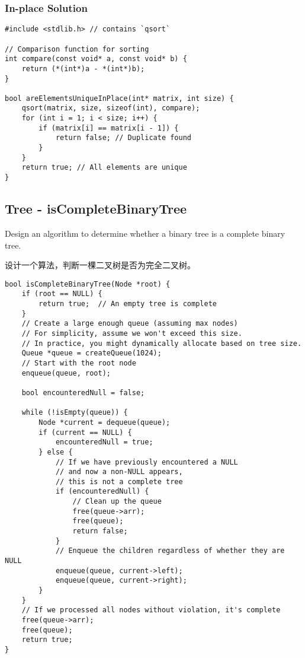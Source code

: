 \documentclass[a4paper]{article}
\begin{document}
\subsubsection{In-place Solution}

\begin{verbatim}
#include <stdlib.h> // contains `qsort`

// Comparison function for sorting
int compare(const void* a, const void* b) {
    return (*(int*)a - *(int*)b);
}

bool areElementsUniqueInPlace(int* matrix, int size) {
    qsort(matrix, size, sizeof(int), compare);
    for (int i = 1; i < size; i++) {
        if (matrix[i] == matrix[i - 1]) {
            return false; // Duplicate found
        }
    }
    return true; // All elements are unique
}
\end{verbatim}

\newpage

\subsection{Tree - isCompleteBinaryTree}

Design an algorithm to determine whether a binary tree is a complete binary tree.

设计一个算法，判断一棵二叉树是否为完全二叉树。

\begin{verbatim}
bool isCompleteBinaryTree(Node *root) {
    if (root == NULL) {
        return true;  // An empty tree is complete
    }
    // Create a large enough queue (assuming max nodes)
    // For simplicity, assume we won't exceed this size.
    // In practice, you might dynamically allocate based on tree size.
    Queue *queue = createQueue(1024);
    // Start with the root node
    enqueue(queue, root);

    bool encounteredNull = false;

    while (!isEmpty(queue)) {
        Node *current = dequeue(queue);
        if (current == NULL) {
            encounteredNull = true;
        } else {
            // If we have previously encountered a NULL
            // and now a non-NULL appears,
            // this is not a complete tree
            if (encounteredNull) {
                // Clean up the queue
                free(queue->arr);
                free(queue);
                return false;
            }
            // Enqueue the children regardless of whether they are NULL
            enqueue(queue, current->left);
            enqueue(queue, current->right);
        }
    }
    // If we processed all nodes without violation, it's complete
    free(queue->arr);
    free(queue);
    return true;
}
\end{verbatim}
\end{document}
